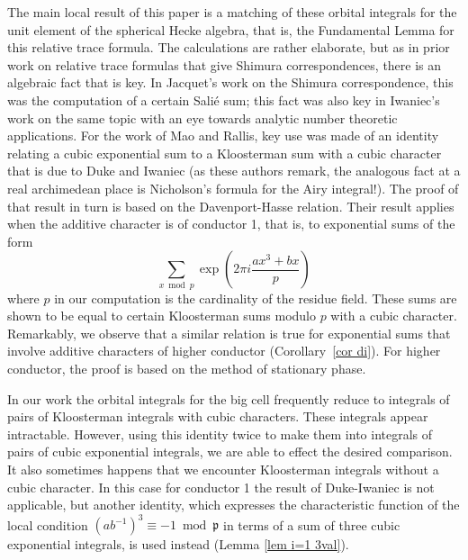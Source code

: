 \documentclass[12pt]{amsart}
\newcommand{\p}{\mathfrak{p}}
\theoremstyle{remark}
\begin{document}
The main local result of this paper is a matching of these orbital integrals for the unit element of the spherical Hecke algebra, 
that is, the Fundamental Lemma for this relative trace formula.
The calculations are rather elaborate, but as in prior work on relative trace formulas that give Shimura correspondences, there is an algebraic fact that is key.
In Jacquet's work on the Shimura correspondence, this was the computation of a certain Sali\'e sum; this fact was also 
key in Iwaniec's work \cite{MR870736} on the same topic
with an eye towards analytic number theoretic applications.  For the work of Mao and Rallis, key use was made of an identity relating a 
cubic exponential sum to a Kloosterman
sum with a cubic character that is due to Duke and Iwaniec \cite{MR1210520} (as these authors remark, the analogous fact at a real 
archimedean place is Nicholson's formula
for the Airy integral!).  The proof of that result in turn is based on the Davenport-Hasse relation.  Their result applies when the additive 
character is of conductor 1, that is, to exponential
sums of the form
$$\sum_{x\bmod p} \exp\left(2 \pi i \frac{ax^3+bx}{p}\right)$$
 where $p$ in our computation is the cardinality of the residue field. These sums are shown to be equal to certain Kloosterman sums modulo $p$ with a cubic character.
 Remarkably, we observe that a similar relation is true for exponential sums that involve additive characters of higher conductor (Corollary~\ref{cor di}). 
 For higher conductor, the proof
 is based on the method of stationary phase. 
 
 In our work the orbital integrals for the big cell frequently reduce to integrals of pairs of Kloosterman integrals with cubic characters.  
 These integrals appear intractable. However, 
 using this identity twice to make
 them into integrals of pairs of cubic exponential integrals, we are able to effect the desired comparison.
 It also sometimes happens that we encounter Kloosterman integrals without a cubic character.  In this case for conductor 1 the result of
 Duke-Iwaniec is not applicable, but another identity, which
expresses the characteristic function of the local condition 
 $(ab^{-1})^3\equiv -1 \bmod \p$ in terms of a sum
of three cubic exponential integrals, is used instead (Lemma \ref{lem i=1 3val}).
  
\end{document}
